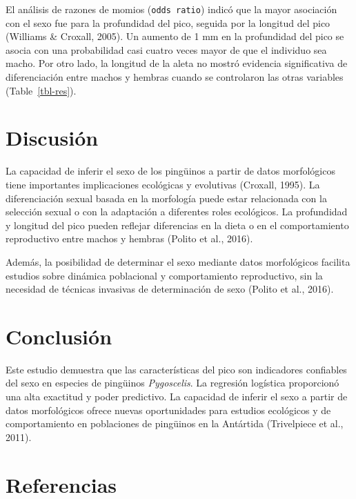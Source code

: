\documentclass[
]{agujournal2019}
\begin{document}
El análisis de razones de momios (\texttt{odds\ ratio}) indicó que la
mayor asociación con el sexo fue para la profundidad del pico, seguida
por la longitud del pico (Williams \& Croxall, 2005). Un aumento de 1 mm
en la profundidad del pico se asocia con una probabilidad casi cuatro
veces mayor de que el individuo sea macho. Por otro lado, la longitud de
la aleta no mostró evidencia significativa de diferenciación entre
machos y hembras cuando se controlaron las otras variables
(Table~\ref{tbl-res}).

\section{Discusión}\label{discusiuxf3n}

La capacidad de inferir el sexo de los pingüinos a partir de datos
morfológicos tiene importantes implicaciones ecológicas y evolutivas
(Croxall, 1995). La diferenciación sexual basada en la morfología puede
estar relacionada con la selección sexual o con la adaptación a
diferentes roles ecológicos. La profundidad y longitud del pico pueden
reflejar diferencias en la dieta o en el comportamiento reproductivo
entre machos y hembras (Polito et al., 2016).

Además, la posibilidad de determinar el sexo mediante datos morfológicos
facilita estudios sobre dinámica poblacional y comportamiento
reproductivo, sin la necesidad de técnicas invasivas de determinación de
sexo (Polito et al., 2016).

\section{Conclusión}\label{conclusiuxf3n}

Este estudio demuestra que las características del pico son indicadores
confiables del sexo en especies de pingüinos \emph{Pygoscelis}. La
regresión logística proporcionó una alta exactitud y poder predictivo.
La capacidad de inferir el sexo a partir de datos morfológicos ofrece
nuevas oportunidades para estudios ecológicos y de comportamiento en
poblaciones de pingüinos en la Antártida (Trivelpiece et al., 2011).

\section*{Referencias}\label{referencias}
\end{document}

